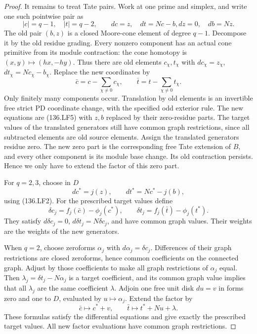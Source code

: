 \begin{proof}
It remains to treat Tate pairs. Work at one prime and simplex,
and write one such pointwise pair as
\[
 |c|=q-1,\quad |t|=q-2,\qquad dc=z,\quad dt=Nc-b,
                    dz=0,\quad db=Nz.                    \tag{136.LF5}
\]
The old pair \((b,z)\) is a closed Moore-cone element of
degree \(q-1\). Decompose it by the old residue grading.
Every nonzero component has an actual cone primitive from
its module contraction: the cone homotopy is
\((x,y)\mapsto(hx,-hy)\). Thus there are old elements
\(c_\chi,t_\chi\) with
\(dc_\chi=z_\chi\), \(dt_\chi=Nc_\chi-b_\chi\).
Replace the new coordinates by
\[
                  \bar c=c-\sum_{\chi\ne0}c_\chi,\qquad
                  \bar t=t-\sum_{\chi\ne0}t_\chi.       \tag{136.LF6}
\]
Only finitely many components occur. Translation by old elements
is an invertible free strict PD coordinate change, with the
specified odd exterior rule. The new equations are (136.LF5)
with \(z,b\) replaced by their zero-residue parts. The
target values of the translated generators still have common
graph restrictions, since all subtracted elements are old source
elements. Assign the translated generators residue zero. The
new zero part is the corresponding free Tate extension of \(B\),
and every other component is its module base change. Its old
contraction persists. Hence we only have to extend the factor
of this zero part.

For \(q=2,3\), choose in \(D\)
\[
              dc^*=j(z),\qquad dt^*=Nc^*-j(b),            \tag{136.LF7}
\]
using (136.LF2). For the prescribed target values define
\[
 \delta c_j=f_j(\bar c)-\phi_j(c^*),\qquad
 \delta t_j=f_j(\bar t)-\phi_j(t^*).
                                                               \tag{136.LF8}
\]
They satisfy \(d\delta c_j=0\),
\(d\delta t_j=N\delta c_j\), and have common graph
values. Their weights are the weights of the new generators.

When \(q=2\), choose zeroforms \(\alpha_j\) with
\(d\alpha_j=\delta c_j\). Differences of their graph
restrictions are closed zeroforms, hence common coefficients
on the connected graph. Adjust by those coefficients to make
all graph restrictions of \(\alpha_j\) equal. Then
\(\lambda_j=\delta t_j-N\alpha_j\) is a target coefficient,
and its common graph value implies that all \(\lambda_j\)
are the same coefficient \(\lambda\). Adjoin one free unit
disk \(du=v\) in forms zero and one to \(D\), evaluated
by \(u\mapsto\alpha_j\). Extend the factor by
\[
                     \bar c\longmapsto c^*+v,\qquad
                     \bar t\longmapsto t^*+Nu+\lambda.
                                                               \tag{136.LF9}
\]
These formulas satisfy the differential equations and give
exactly the prescribed target values. All new factor evaluations
have common graph restrictions.


\end{proof}
